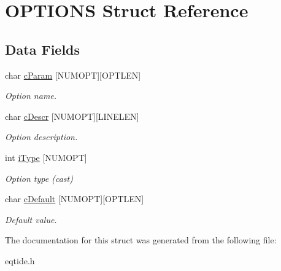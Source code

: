 \hypertarget{struct_o_p_t_i_o_n_s}{}\section{O\+P\+T\+I\+O\+N\+S Struct Reference}
\label{struct_o_p_t_i_o_n_s}
\subsection*{Data Fields}
\begin{DoxyCompactItemize}
\item 
\hypertarget{struct_o_p_t_i_o_n_s_a4744a1b757956601637fc40cf93b0de8}{}char \hyperlink{struct_o_p_t_i_o_n_s_a4744a1b757956601637fc40cf93b0de8}{c\+Param} \mbox{[}N\+U\+M\+O\+P\+T\mbox{]}\mbox{[}O\+P\+T\+L\+E\+N\mbox{]}\label{struct_o_p_t_i_o_n_s_a4744a1b757956601637fc40cf93b0de8}

\begin{DoxyCompactList}\small\item\em Option name. \end{DoxyCompactList}\item 
\hypertarget{struct_o_p_t_i_o_n_s_ad0e559b82b4153e0ef15a72f02eaa77f}{}char \hyperlink{struct_o_p_t_i_o_n_s_ad0e559b82b4153e0ef15a72f02eaa77f}{c\+Descr} \mbox{[}N\+U\+M\+O\+P\+T\mbox{]}\mbox{[}L\+I\+N\+E\+L\+E\+N\mbox{]}\label{struct_o_p_t_i_o_n_s_ad0e559b82b4153e0ef15a72f02eaa77f}

\begin{DoxyCompactList}\small\item\em Option description. \end{DoxyCompactList}\item 
\hypertarget{struct_o_p_t_i_o_n_s_a2acac8b5d3e5289441ffbe7f8010e5c0}{}int \hyperlink{struct_o_p_t_i_o_n_s_a2acac8b5d3e5289441ffbe7f8010e5c0}{i\+Type} \mbox{[}N\+U\+M\+O\+P\+T\mbox{]}\label{struct_o_p_t_i_o_n_s_a2acac8b5d3e5289441ffbe7f8010e5c0}

\begin{DoxyCompactList}\small\item\em Option type (cast) \end{DoxyCompactList}\item 
\hypertarget{struct_o_p_t_i_o_n_s_a0dc999e4cc73e6a871b9440a87358047}{}char \hyperlink{struct_o_p_t_i_o_n_s_a0dc999e4cc73e6a871b9440a87358047}{c\+Default} \mbox{[}N\+U\+M\+O\+P\+T\mbox{]}\mbox{[}O\+P\+T\+L\+E\+N\mbox{]}\label{struct_o_p_t_i_o_n_s_a0dc999e4cc73e6a871b9440a87358047}

\begin{DoxyCompactList}\small\item\em Default value. \end{DoxyCompactList}\end{DoxyCompactItemize}


The documentation for this struct was generated from the following file\+:\begin{DoxyCompactItemize}
\item 
eqtide.\+h\end{DoxyCompactItemize}
